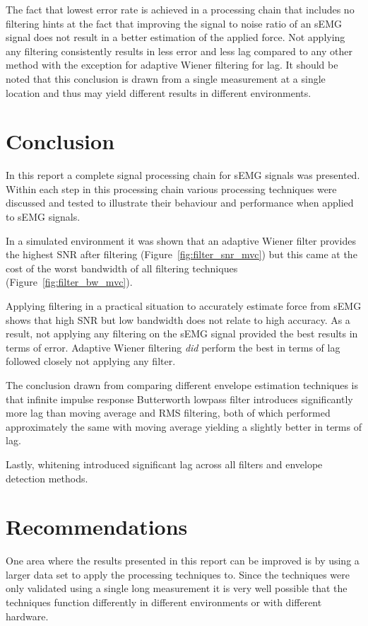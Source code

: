 The fact that lowest error rate is achieved in a processing chain that includes no filtering hints at the fact that improving the signal to noise ratio of an sEMG signal does not result in a better estimation of the applied force. Not applying any filtering consistently results in less error and less lag compared to any other method with the exception for adaptive Wiener filtering for lag. It should be noted that this conclusion is drawn from a single measurement at a single location and thus may yield different results in different environments. 

\section{Conclusion}
In this report a complete signal processing chain for sEMG signals was presented. Within each step in this processing chain various processing techniques were discussed and tested to illustrate their behaviour and performance when applied to sEMG signals.

In a simulated environment it was shown that an adaptive Wiener filter provides the highest SNR after filtering (Figure~\ref{fig:filter_snr_mvc}) but this came at the cost of the worst bandwidth of all filtering techniques (Figure~\ref{fig:filter_bw_mvc}).

Applying filtering in a practical situation to accurately estimate force from sEMG shows that high SNR but low bandwidth does not relate to high accuracy. As a result, not applying any filtering on the sEMG signal provided the best results in terms of error. Adaptive Wiener filtering \textit{did} perform the best in terms of lag followed closely not applying any filter. 

The conclusion drawn from comparing different envelope estimation techniques is that infinite impulse response Butterworth lowpass filter introduces significantly more lag than moving average and RMS filtering, both of which performed approximately the same with moving average yielding a slightly better in terms of lag.

Lastly, whitening introduced significant lag across all filters and envelope detection methods.

\section{Recommendations}
One area where the results presented in this report can be improved is by using a larger data set to apply the processing techniques to. Since the techniques were only validated using a single long measurement it is very well possible that the techniques function differently in different environments or with different hardware.

